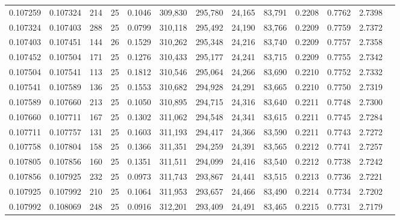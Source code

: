 \begin{tabular}{rrrrrrrrrrrrr}
0.107259 & 0.107324 &   214 &  25 &                                     0.1046 & 309,830 & 295,780 &  24,165 &  83,791 & 0.2208 & 0.7762 & 2.7398 \\
0.107324 & 0.107403 &   288 &  25 &                                     0.0799 & 310,118 & 295,492 &  24,190 &  83,766 & 0.2209 & 0.7759 & 2.7372 \\
0.107403 & 0.107451 &   144 &  26 &                                     0.1529 & 310,262 & 295,348 &  24,216 &  83,740 & 0.2209 & 0.7757 & 2.7358 \\
0.107452 & 0.107504 &   171 &  25 &                                     0.1276 & 310,433 & 295,177 &  24,241 &  83,715 & 0.2209 & 0.7755 & 2.7342 \\
0.107504 & 0.107541 &   113 &  25 &                                     0.1812 & 310,546 & 295,064 &  24,266 &  83,690 & 0.2210 & 0.7752 & 2.7332 \\
0.107541 & 0.107589 &   136 &  25 &                                     0.1553 & 310,682 & 294,928 &  24,291 &  83,665 & 0.2210 & 0.7750 & 2.7319 \\
0.107589 & 0.107660 &   213 &  25 &                                     0.1050 & 310,895 & 294,715 &  24,316 &  83,640 & 0.2211 & 0.7748 & 2.7300 \\
0.107660 & 0.107711 &   167 &  25 &                                     0.1302 & 311,062 & 294,548 &  24,341 &  83,615 & 0.2211 & 0.7745 & 2.7284 \\
0.107711 & 0.107757 &   131 &  25 &                                     0.1603 & 311,193 & 294,417 &  24,366 &  83,590 & 0.2211 & 0.7743 & 2.7272 \\
0.107758 & 0.107804 &   158 &  25 &                                     0.1366 & 311,351 & 294,259 &  24,391 &  83,565 & 0.2212 & 0.7741 & 2.7257 \\
0.107805 & 0.107856 &   160 &  25 &                                     0.1351 & 311,511 & 294,099 &  24,416 &  83,540 & 0.2212 & 0.7738 & 2.7242 \\
0.107856 & 0.107925 &   232 &  25 &                                     0.0973 & 311,743 & 293,867 &  24,441 &  83,515 & 0.2213 & 0.7736 & 2.7221 \\
0.107925 & 0.107992 &   210 &  25 &                                     0.1064 & 311,953 & 293,657 &  24,466 &  83,490 & 0.2214 & 0.7734 & 2.7202 \\
0.107992 & 0.108069 &   248 &  25 &                                     0.0916 & 312,201 & 293,409 &  24,491 &  83,465 & 0.2215 & 0.7731 & 2.7179 \\

\end{tabular}
